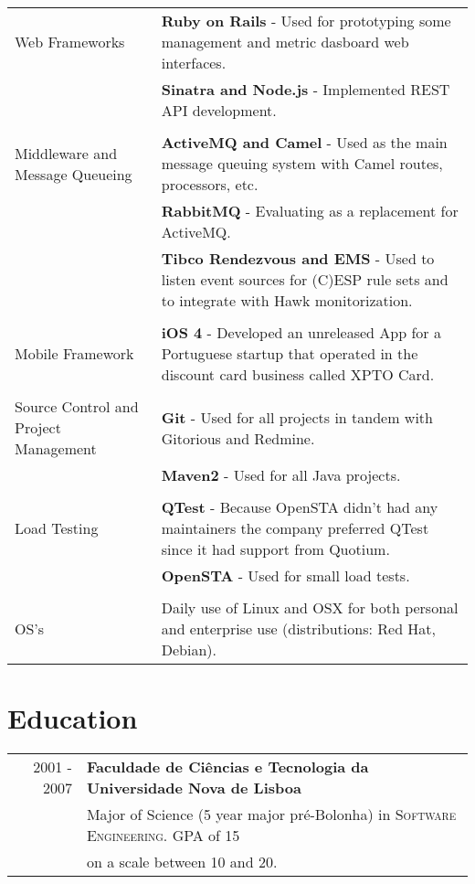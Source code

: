 \documentclass[a4paper,10pt]{article}
\begin{document}
\begin{tabular}{p{4cm}|p{9cm}}
	Web Frameworks
	& {\bf Ruby on Rails} - Used for prototyping some management and metric dasboard web interfaces. \\
	& {\bf Sinatra and Node.js} - Implemented REST API development. \\
\multicolumn{2}{c}{} \\
	Middleware and Message Queueing
	& {\bf ActiveMQ and Camel} - Used as the main message queuing system with Camel routes, processors, etc. \\
	& {\bf RabbitMQ} - Evaluating as a replacement for ActiveMQ. \\
	& {\bf Tibco Rendezvous and EMS} -  Used to listen event sources for (C)ESP rule sets and to integrate with Hawk monitorization.\\
\multicolumn{2}{c}{} \\
	Mobile Framework
	&  {\bf iOS 4} - Developed an unreleased App for a Portuguese startup that operated in the discount card business called XPTO Card.\\
\multicolumn{2}{c}{} \\
	Source Control and Project Management
	& {\bf Git} - Used for all projects in tandem with Gitorious and Redmine. \\
	& {\bf Maven2} - Used for all Java projects.\\
\multicolumn{2}{c}{} \\
	Load Testing 
	& {\bf QTest} - Because OpenSTA didn't had any maintainers the company preferred QTest since it had support from Quotium. \\
	& {\bf OpenSTA} - Used for small load tests. \\
\multicolumn{2}{c}{} \\ 
	OS's 
	&  Daily use of Linux and OSX for both personal and enterprise use (distributions: Red Hat, Debian). \\
\end{tabular}

\section{Education}
\begin{tabular}{rl}	
2001 - 2007 & \textbf{Faculdade de Ciências e Tecnologia da Universidade Nova de Lisboa}\\
 & Major of Science (5 year major pré-Bolonha) in \textsc{Software Engineering}. GPA of 15\\
 & on a scale between 10 and 20. \\
\end{tabular}
\end{document}
